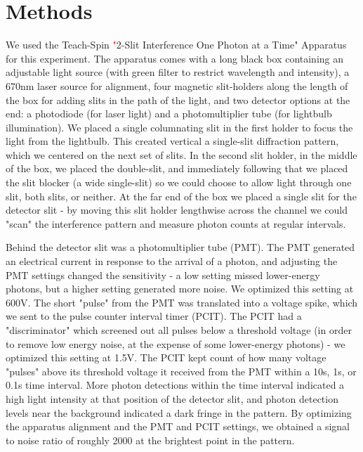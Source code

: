 \documentclass[prb,preprint]{revtex4-1}
\begin{document}
\section{Methods}

We used the Teach-Spin\textcolor{red}{ "}2-Slit Interference One Photon at a Time" Apparatus for this experiment.  The apparatus comes with a long black box containing an adjustable light source (with green filter to restrict wavelength and intensity), a 670nm laser source for alignment, four magnetic slit-holders along the length of the box for adding slits in the path of the light, and two detector options at the end: a photodiode (for laser light) and a photomultiplier tube (for lightbulb illumination).  We placed a single columnating slit in the first holder to focus the light from the lightbulb. This created vertical a single-slit diffraction pattern, which we centered on the next set of slits.  In the second slit holder, in the middle of the box, we placed the double-slit, and immediately following that we placed the slit blocker (a wide single-slit) so we could choose to allow light through one slit, both slits, or neither.  At the far end of the box we placed a single slit for the detector slit - by moving this slit holder lengthwise across the channel we could "scan" the interference pattern and measure photon counts at regular intervals.  

Behind the detector slit was a photomultiplier tube (PMT).  The PMT generated an electrical current in response to the arrival of a photon, and adjusting the PMT settings changed the sensitivity - a low setting missed lower-energy photons, but a higher setting generated more noise.  We optimized this setting at 600V.  The short "pulse" from the PMT was translated into a voltage spike, which we sent to the pulse counter interval timer (PCIT).  The PCIT had a "discriminator" which screened out all pulses below a threshold voltage (in order to remove low energy noise, at the expense of some lower-energy photons) - we optimized this setting at 1.5V. The PCIT kept count of how many voltage "pulses" above its threshold voltage it received from the PMT within a 10s, 1s, or 0.1s time interval. More photon detections within the time interval indicated a high light intensity at that position of the detector slit, and photon detection levels near the background indicated a dark fringe in the pattern. By optimizing the apparatus alignment and the PMT and PCIT settings, we obtained a signal to noise ratio of roughly 2000 at the brightest point in the pattern.  
\end{document}
